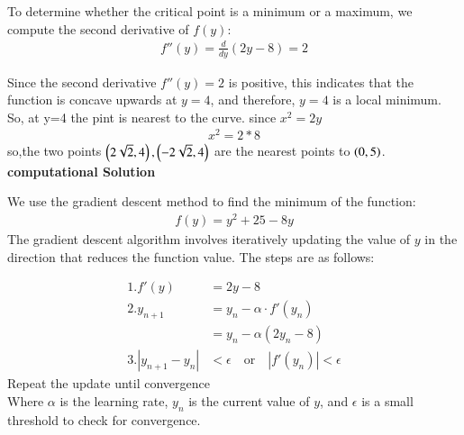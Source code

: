 \documentclass[journal]{IEEEtran}
\begin{document}
To determine whether the critical point is a minimum or a maximum, we compute the second derivative of \( f(y) \):
\begin{align}
f''(y) = \frac{d}{dy}(2y - 8) = 2
\end{align}

Since the second derivative \( f''(y) = 2 \) is positive, this indicates that the function is concave upwards at \( y = 4 \), and therefore, \( y = 4 \) is a local minimum.\\
So, at y=4 the pint is nearest to the curve.
since $x^2=2y$\\
\begin{align}
    x^2=2*8
\end{align}
so,the two points $\left(2\sqrt{2},4\right),\left(-2\sqrt{2},4\right)$ are the nearest points to $\left(0,5\right)$.
\textbf{computational Solution}

We use the gradient descent method to find the minimum of the function:
\begin{align}
f(y) = y^2 + 25 - 8y
\end{align}
The gradient descent algorithm involves iteratively updating the value of \( y \) in the direction that reduces the function value. The steps are as follows:

\begin{align}
1. f'(y) &= 2y - 8 \\
2.y_{n+1} &= y_n - \alpha \cdot f'(y_n) \\
          &= y_n - \alpha (2y_n - 8) \\
3. |y_{n+1} - y_n| &< \epsilon \quad \text{or} \quad |f'(y_n)| < \epsilon
\end{align}
Repeat the update until convergence\\
Where $\alpha$ is the learning rate, $y_n $ is the current value of $ y $, and $\epsilon$ is a small threshold to check for convergence.
\end{document}
